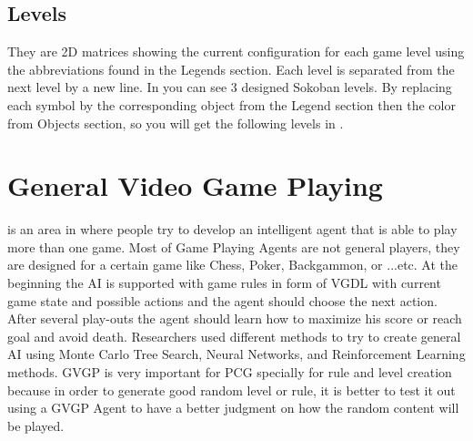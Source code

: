 \subsection{Levels}
They are 2D matrices showing the current configuration for each game level using the abbreviations found in the Legends section. Each level is separated from the next level by a new line. In  you can see 3 designed Sokoban levels. By replacing each symbol by the corresponding object from the Legend section then the color from Objects section, so you will get the following levels in . 
\newpage
{}

\section{General Video Game Playing}
 is an area in  where people try to develop an intelligent agent that is able to play more than one game. Most of Game Playing Agents are not general players, they are designed for a certain game like Chess, Poker, Backgammon, or ...etc. At the beginning the AI is supported with game rules in form of VGDL  with current game state and possible actions and the agent should choose the next action. After several play-outs the agent should learn how to maximize his score or reach goal and avoid death. Researchers used different methods to try to create general AI using Monte Carlo Tree Search, Neural Networks, and Reinforcement Learning methods. GVGP is very important for PCG specially for rule and level creation because in order to generate good random level or rule, it is better to test it out using a GVGP Agent to have a better judgment on how the random content will be played.\cite{gvgp}